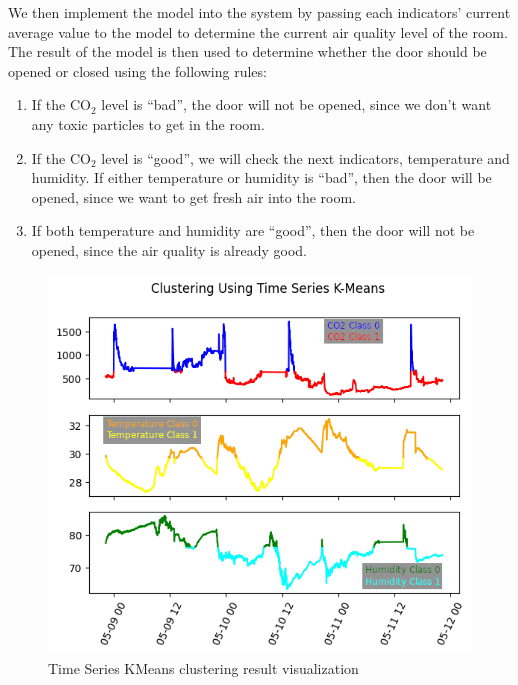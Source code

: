 We then implement the model into the system by passing each
indicators' current average value to the model to determine
the current air quality level of the room. The result of the
model is then used to determine whether the door should be
opened or closed using the following rules:
\begin{enumerate}
    \item If the CO$_2$ level is ``bad'', the door will not be
          opened, since we don't want any toxic particles to
          get in the room.
    \item If the CO$_2$ level is ``good'', we will check the
          next indicators, temperature and humidity. If
          either temperature or humidity is ``bad'', then the
          door will be opened, since we want to get fresh
          air into the room.
    \item If both temperature and humidity are ``good'',
          then the door will not be opened, since the air
          quality is already good.
\end{enumerate}


\begin{figure}
    \centerline{\includegraphics[scale=0.65]{resources/iot-clustering.png}}
    \caption{Time Series KMeans clustering result visualization}
    \label{kmeans}
\end{figure}